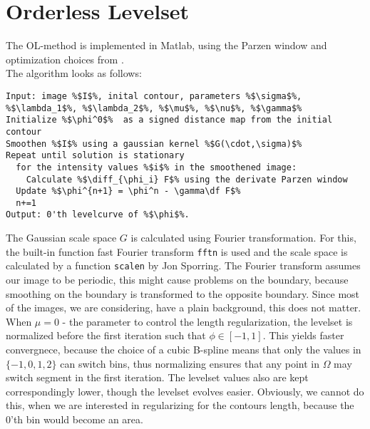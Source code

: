 \section{Orderless Levelset}
The OL-method is implemented in Matlab, using the Parzen window and optimization choices from .\\
The algorithm looks as follows:\\

\begin{lstlisting}
Input: image %$I$%, inital contour, parameters %$\sigma$%, %$\lambda_1$%, %$\lambda_2$%, %$\mu$%, %$\nu$%, %$\gamma$%
Initialize %$\phi^0$%  as a signed distance map from the initial contour
Smoothen %$I$% using a gaussian kernel %$G(\cdot,\sigma)$%
Repeat until solution is stationary
  for the intensity values %$i$% in the smoothened image:
    Calculate %$\diff_{\phi_i} F$% using the derivate Parzen window
  Update %$\phi^{n+1} = \phi^n - \gamma\df F$%
  n+=1
Output: 0'th levelcurve of %$\phi$%.
\end{lstlisting} 

The Gaussian scale space $G$ is calculated using Fourier transformation. For this, the built-in function fast Fourier transform \texttt{fftn} is used and the scale space is calculated by a function \texttt{scalen} by Jon Sporring. The Fourier transform assumes our image to be periodic, this might cause problems on the boundary, because smoothing on the boundary is transformed to the opposite boundary. Since most of the images, we are considering, have a plain background, this does not matter.\\
When $\mu=0$ - the parameter to control the length regularization, the levelset is normalized before the first iteration such that $\phi\in [-1,1]$. This yields faster convergnece, because the choice of a cubic B-spline means that only the values in $\{-1,0,1,2\}$ can switch bins, thus normalizing ensures that any point in $\Omega$ may switch segment in the first iteration. The levelset values also are kept correspondingly lower, though the levelset evolves easier. Obviously, we cannot do this, when we are interested in regularizing for the contours length, because the 0'th bin would become an area.\\

